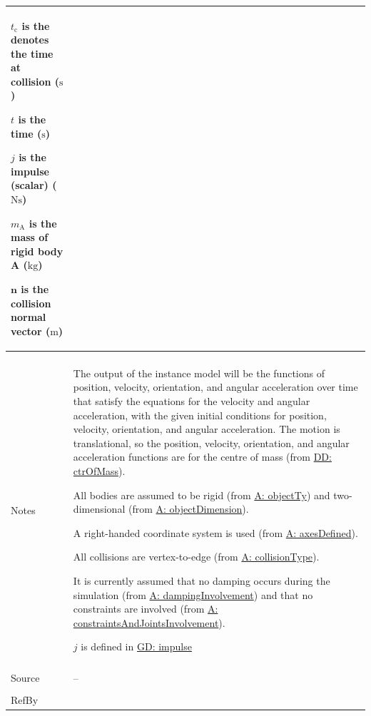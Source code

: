 \documentclass[12pt]{article}
\begin{document}
\begin{minipage}{\textwidth}
\begin{tabular}{>{\raggedright}p{}>{\raggedright\arraybackslash}p{}}
\begin{symbDescription}
              \item{${t_{\text{c}}}$ is the denotes the time at collision (${\text{s}}$)}
              \item{$t$ is the time (${\text{s}}$)}
              \item{$j$ is the impulse (scalar) ($\text{N}\text{s}$)}
              \item{${m_{\text{A}}}$ is the mass of rigid body A (${\text{kg}}$)}
              \item{$\mathbf{n}$ is the collision normal vector (${\text{m}}$)}
              \end{symbDescription}
\\ \midrule \\
Notes & The output of the instance model will be the functions of position, velocity, orientation, and angular acceleration over time that satisfy the equations for the velocity and angular acceleration, with the given initial conditions for position, velocity, orientation, and angular acceleration. The motion is translational, so the position, velocity, orientation, and angular acceleration functions are for the centre of mass (from \hyperref[DD:ctrOfMass]{DD: ctrOfMass}).
        
        All bodies are assumed to be rigid (from \hyperref[assumpOT]{A: objectTy}) and two-dimensional (from \hyperref[assumpOD]{A: objectDimension}).
        
        A right-handed coordinate system is used (from \hyperref[assumpAD]{A: axesDefined}).
        
        All collisions are vertex-to-edge (from \hyperref[assumpCT]{A: collisionType}).
        
        It is currently assumed that no damping occurs during the simulation (from \hyperref[assumpDI]{A: dampingInvolvement}) and that no constraints are involved (from \hyperref[assumpCAJI]{A: constraintsAndJointsInvolvement}).
        
        $j$ is defined in \hyperref[GD:impulse]{GD: impulse}
        
\\ \midrule \\
Source & --
         
\\ \midrule \\
RefBy & 
\\ \bottomrule
\end{tabular}
\end{minipage}
\end{document}
